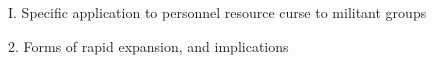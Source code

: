 I. Specific application to personnel resource curse to militant groups

    2. Forms of rapid expansion, and implications %
    
